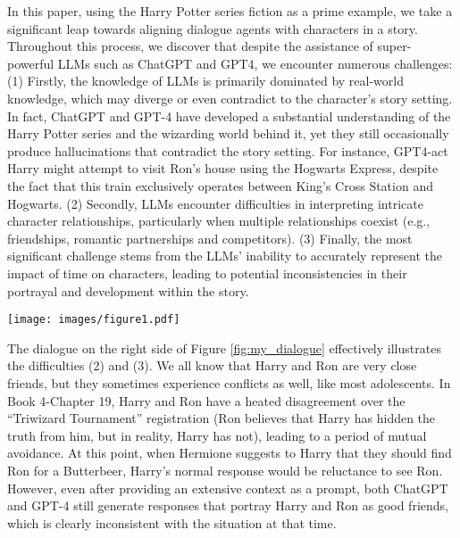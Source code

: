 \documentclass[11pt]{article}
\begin{document}
%
 
In this paper, using the Harry Potter series fiction as a prime example, we take a significant leap towards aligning dialogue agents with  characters in a story.
Throughout this process, we discover that despite the assistance of super-powerful LLMs such as ChatGPT and GPT4, we encounter numerous challenges: (1) Firstly, 
the knowledge of LLMs is primarily dominated by real-world knowledge, which may diverge or even contradict to the character's story setting. In fact, ChatGPT and GPT-4 have developed a substantial understanding of the Harry Potter series and the wizarding world behind it, yet they still occasionally produce hallucinations that contradict the story setting. For instance, GPT4-act Harry might attempt to visit Ron's house using the Hogwarts Express, despite the fact that this train exclusively operates between King's Cross Station and Hogwarts.
(2) Secondly, LLMs encounter difficulties in interpreting  intricate character relationships, particularly when multiple relationships coexist (e.g., friendships, romantic partnerships and competitors). (3) Finally, the most significant challenge stems from the LLMs' inability to accurately represent the impact of time on characters, leading to potential inconsistencies in their portrayal and development within the story.
 \begin{figure*}
 \vspace{-10pt}
    \centering
    \texttt{[image: images/figure1.pdf]}
    \caption{A conversation between Harry and Hermione selected from Book 4-Chapter 19 in the Harry Potter Series. In this example, we present the scene, timing of the conversation,  relations and attributes of speakers.
    Texts in red refer to the expected response. }
    \vspace{-10pt}
    
    \label{fig:my_dialogue}
\end{figure*}

The dialogue on the right side of Figure \ref{fig:my_dialogue} effectively illustrates the difficulties (2) and (3). We all know that Harry and Ron are very close friends, but they sometimes experience conflicts as well, like most adolescents. In Book 4-Chapter 19, Harry and Ron have a heated disagreement over the ``Triwizard Tournament'' registration (Ron believes that Harry has hidden the truth from him, but in reality, Harry has not), leading to a period of mutual avoidance. At this point, when Hermione suggests to Harry that they should find Ron for a Butterbeer, Harry's normal response would be reluctance to see Ron. However, even after providing an extensive context as a prompt, both ChatGPT and GPT-4 still generate responses that portray Harry and Ron as good friends, which is clearly inconsistent with the situation at that time.
\end{document}
